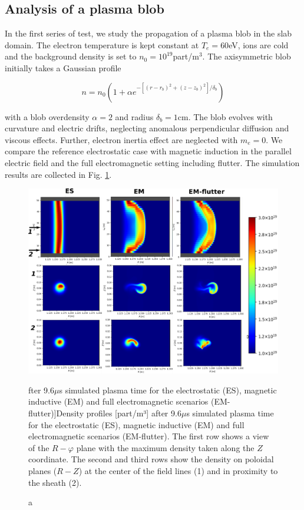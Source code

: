\subsection{Analysis of a plasma blob}
\label{ssec:plasmablob}

In the first series of test, we study the propagation of a plasma blob in the slab domain. The electron temperature is kept constant at $T_e=60$eV, ions are cold and the background density is set to $n_0 = 10^{19}$part/m$^3$. The axisymmetric blob initially takes a Gaussian profile 

\begin{equation}
	n = n_0 \left(1 + \alpha e^{-\left[(r-r_b)^2+(z-z_b)^2\right]/\delta_b}\right)
	\label{eq:blobInitProfile}
\end{equation}

with a blob overdensity $\alpha = 2$ and radius $\delta_b = 1$cm. The blob evolves with curvature and electric drifts, neglecting anomalous perpendicular diffusion and viscous effects. Further, electron inertia effect are neglected with $m_e = 0$. We compare the reference electrostatic case with magnetic induction in the parallel electric field and the full electromagnetic setting including flutter. The simulation results are collected in Fig. \ref{fig:BLOB}. \newline

\begin{figure}[H]\centering
	\centering
	\includegraphics[width=1.\textwidth]{schemes/blob_compare_9_6_microsec.png}
	\caption[Density profiles [part/m³] after 9.6$\mu$s simulated plasma time for the electrostatic (ES), magnetic inductive (EM) and full electromagnetic scenarios (EM-flutter)]{Density profiles [part/m³] after 9.6$\mu$s simulated plasma time for the electrostatic (ES), magnetic inductive (EM) and full electromagnetic scenarios (EM-flutter). The first row shows a view of the $R-\varphi$ plane with the maximum density taken along the $Z$ coordinate. The second and third rows show the density on poloidal planes ($R-Z$) at the center of the field lines (1) and in proximity to the sheath (2).}
	\label{fig:BLOB}
\end{figure}

